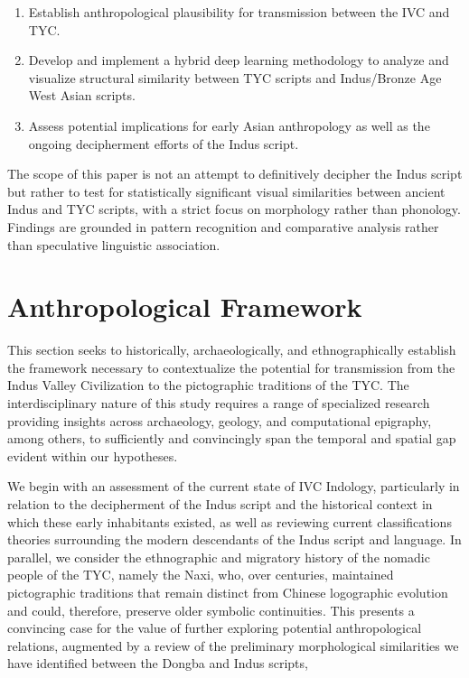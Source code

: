 \documentclass[11pt,a4paper,oneside]{report}
\begin{document}
\begin{enumerate}
    \item Establish anthropological plausibility for transmission between the IVC and TYC.
    \item Develop and implement a hybrid deep learning methodology to analyze and visualize structural similarity between TYC scripts and Indus/Bronze Age West Asian scripts.
    \item Assess potential implications for early Asian anthropology as well as the ongoing decipherment efforts of the Indus script.
\end{enumerate}
The scope of this paper is not an attempt to definitively decipher the Indus script but rather to test for statistically significant visual similarities between ancient Indus and TYC scripts, with a strict focus on morphology rather than phonology. Findings are grounded in pattern recognition and comparative analysis rather than speculative linguistic association.

\chapter{Anthropological Framework}
\label{anthropological framework}
\noindent\hspace{1cm}
This section seeks to historically, archaeologically, and ethnographically establish the framework necessary to contextualize the potential for transmission from the Indus Valley Civilization to the pictographic traditions of the TYC. The interdisciplinary nature of this study requires a range of specialized research providing insights across archaeology, geology, and computational epigraphy, among others, to sufficiently and convincingly span the temporal and spatial gap evident within our hypotheses.

We begin with an assessment of the current state of IVC Indology, particularly in relation to the decipherment of the Indus script and the historical context in which these early inhabitants existed, as well as reviewing current classifications theories surrounding the modern descendants of the Indus script and language. In parallel, we consider the ethnographic and migratory history of the nomadic people of the TYC, namely the Naxi, who, over centuries, maintained pictographic traditions that remain distinct from Chinese logographic evolution and could, therefore, preserve older symbolic continuities. This presents a convincing case for the value of further exploring potential anthropological relations, augmented by a review of the preliminary morphological similarities we have identified between the Dongba and Indus scripts, 
\end{document}
